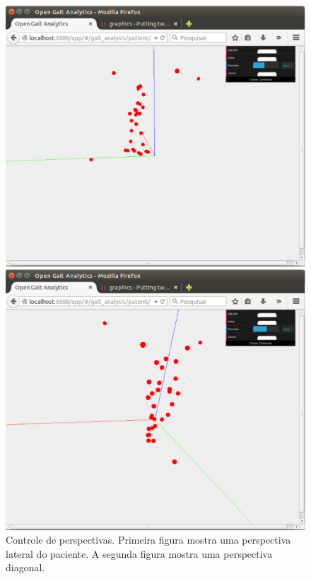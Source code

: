 \begin{figure}[H]
  \centering
  \begin{minipage}[b]{0.40\textwidth}
    \includegraphics[width=\textwidth]{figuras/tela11.eps}
  \end{minipage}
  \hfill
  \begin{minipage}[b]{0.40\textwidth}
    \includegraphics[width=\textwidth]{figuras/tela12.eps}
  \end{minipage}
  \caption[Controle de perspectivas.]{Controle de perspectivas. Primeira figura mostra uma perspectiva lateral do paciente. A segunda figura mostra uma perspectiva diagonal.}
  \label{animacao2}
\end{figure}

